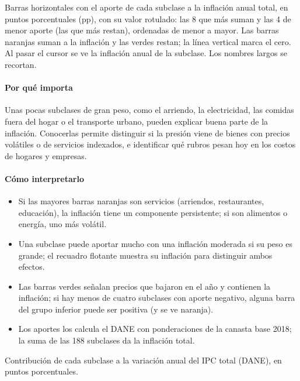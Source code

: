 \begin{leer}
Barras horizontales con el aporte de cada subclase a la inflación anual total, en puntos porcentuales (pp), con su valor rotulado: las 8 que más suman y las 4 de menor aporte (las que más restan), ordenadas de menor a mayor. Las barras naranjas suman a la inflación y las verdes restan; la línea vertical marca el cero. Al pasar el cursor se ve la inflación anual de la subclase. Los nombres largos se recortan.
\end{leer}

\paragraph{Por qué importa}
Unas pocas subclases de gran peso, como el arriendo, la electricidad, las comidas fuera del hogar o el transporte urbano, pueden explicar buena parte de la inflación. Conocerlas permite distinguir si la presión viene de bienes con precios volátiles o de servicios indexados, e identificar qué rubros pesan hoy en los costos de hogares y empresas.

\paragraph{Cómo interpretarlo}
\begin{itemize}
\item Si las mayores barras naranjas son servicios (arriendos, restaurantes, educación), la inflación tiene un componente persistente; si son alimentos o energía, uno más volátil.
\item Una subclase puede aportar mucho con una inflación moderada si su peso es grande; el recuadro flotante muestra su inflación para distinguir ambos efectos.
\item Las barras verdes señalan precios que bajaron en el año y contienen la inflación; si hay menos de cuatro subclases con aporte negativo, alguna barra del grupo inferior puede ser positiva (y se ve naranja).
\item Los aportes los calcula el DANE con ponderaciones de la canasta base 2018; la suma de las 188 subclases da la inflación total.
\end{itemize}
\begin{formulas}[Fórmulas]
\end{formulas}
\begin{metodo}[Metodología]
Contribución de cada subclase a la variación anual del IPC total (DANE), en puntos porcentuales.
\par{}
\end{metodo}

